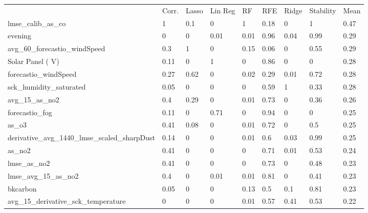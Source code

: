 \begin{table}[H]
\centering
\begin{tabular}{lllllllll}
\\
\\
\toprule
     & Corr. & Lasso & Lin Reg & RF   & RFE  & Ridge & Stability & Mean \\
\midrule
lmse\_calib\_as\_co                            & 1     & 0.1   & 0          & 1    & 0.18 & 0     & 1         & 0.47 \\
evening                                        & 0     & 0     & 0.01       & 0.01 & 0.96 & 0.04  & 0.99      & 0.29 \\
avg\_60\_forecastio\_windSpeed                 & 0.3   & 1     & 0          & 0.15 & 0.06 & 0     & 0.55      & 0.29 \\
Solar Panel ( V)                               & 0.11  & 0     & 1          & 0    & 0.86 & 0     & 0         & 0.28 \\
forecastio\_windSpeed                          & 0.27  & 0.62  & 0          & 0.02 & 0.29 & 0.01  & 0.72      & 0.28 \\
sck\_humidity\_saturated                       & 0.05  & 0     & 0          & 0    & 0.59 & 1     & 0.33      & 0.28 \\
avg\_15\_as\_no2                               & 0.4   & 0.29  & 0          & 0.01 & 0.73 & 0     & 0.36      & 0.26 \\
forecastio\_fog                                & 0.11  & 0     & 0.71       & 0    & 0.94 & 0     & 0         & 0.25 \\
as\_o3                                         & 0.41  & 0.08  & 0          & 0.01 & 0.72 & 0     & 0.5       & 0.25 \\
derivative\_avg\_1440\_lmse\_scaled\_sharpDust & 0.14  & 0     & 0          & 0.01 & 0.6  & 0.03  & 0.99      & 0.25 \\
as\_no2                                        & 0.41  & 0     & 0          & 0    & 0.71 & 0.01  & 0.53      & 0.24 \\
lmse\_as\_no2                                  & 0.41  & 0     & 0          & 0    & 0.73 & 0     & 0.48      & 0.23 \\
lmse\_avg\_15\_as\_no2                         & 0.4   & 0     & 0.01       & 0.01 & 0.81 & 0     & 0.41      & 0.23 \\
bkcarbon                                       & 0.05  & 0     & 0          & 0.13 & 0.5  & 0.1   & 0.81      & 0.23 \\
avg\_15\_derivative\_sck\_temperature          & 0     & 0     & 0          & 0.01 & 0.57 & 0.41  & 0.53      & 0.22 \\

\end{tabular}
\end{table}
